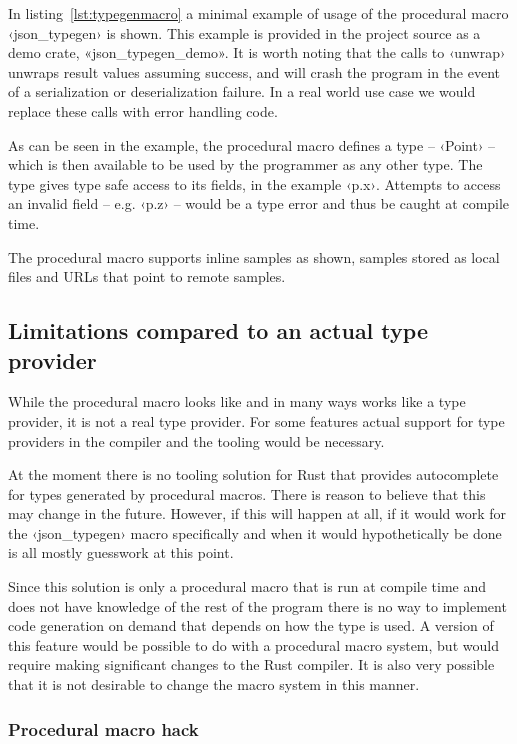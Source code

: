 In listing~\ref{lst:typegenmacro} a minimal example of usage of the procedural macro ‹json_typegen› is shown. This example is provided in the project source as a demo crate, «json_typegen_demo». It is worth noting that the calls to ‹unwrap› unwraps result values assuming success, and will crash the program in the event of a serialization or deserialization failure. In a real world use case we would replace these calls with error handling code.

As can be seen in the example, the procedural macro defines a type -- ‹Point› -- which is then available to be used by the programmer as any other type. The type gives type safe access to its fields, in the example ‹p.x›. Attempts to access an invalid field -- e.g. ‹p.z› -- would be a type error and thus be caught at compile time.

The procedural macro supports inline samples as shown, samples stored as local files and URLs that point to remote samples.

\subsection{Limitations compared to an actual type provider}
\label{sec:macro-limitations}

While the procedural macro looks like and in many ways works like a type provider, it is not a real type provider. For some features actual support for type providers in the compiler and the tooling would be necessary.

At the moment there is no tooling solution for Rust that provides autocomplete for types generated by procedural macros. There is reason to believe that this may change in the future. However, if this will happen at all, if it would work for the ‹json_typegen› macro specifically and when it would hypothetically be done is all mostly guesswork at this point.

Since this solution is only a procedural macro that is run at compile time and does not have knowledge of the rest of the program there is no way to implement code generation on demand that depends on how the type is used. A version of this feature would be possible to do with a procedural macro system, but would require making significant changes to the Rust compiler. It is also very possible that it is not desirable to change the macro system in this manner.

\subsubsection{Procedural macro hack}

